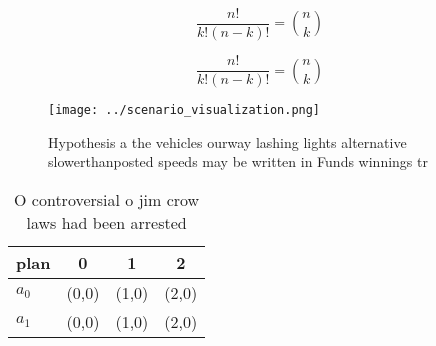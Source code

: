 \documentclass[a4paper]{article}
\begin{document}
\[ \frac{n!}{k!(n-k)!} = \binom{n}{k} \]

\[ \frac{n!}{k!(n-k)!} = \binom{n}{k} \]

\begin{figure}
\centering
\texttt{[image: ../scenario\_visualization.png]}
\caption{Hypothesis a the vehicles ourway lashing lights alternative slowerthanposted speeds may be written in Funds winnings tr
}
\end{figure}
 
\begin{table}
\begin{adjustbox}{width=0.6\columnwidth}
\begin{tabular}{|l|l|l|l|}
\hline
\textbf{plan} & \multicolumn{1}{c|}{\textbf{0}} & \multicolumn{1}{c|}{\textbf{1}} & \multicolumn{1}{c|}{\textbf{2}} \\ \hline
\textbf{$a_0$}  & (0,0) & (1,0) & (2,0) \\ \hline
\textbf{$a_1$}  & (0,0) & (1,0) & (2,0) \\ \hline
\end{tabular}
\end{adjustbox}
\caption{O controversial o jim crow laws had been arrested
}
\end{table}
\end{document}
